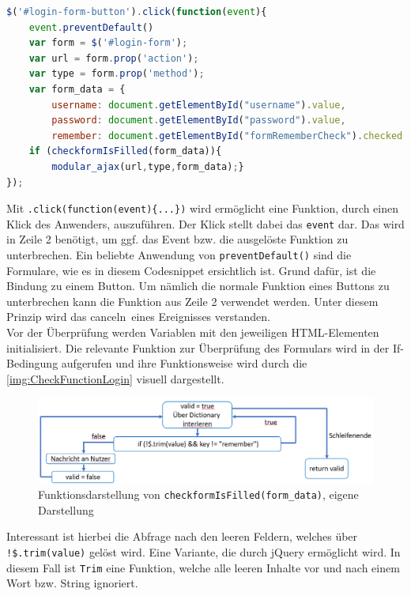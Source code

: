 \documentclass[a4paper,titlepage,halfparskip,12pt]{scrreprt}
\begin{document}
\begin{onehalfspacing}
\begin{lstlisting}[language=Javascript,caption=Angehängte Funktion an ein HTML-Element,label={lst:JSLoginButton}]
$('#login-form-button').click(function(event){
	event.preventDefault()
	var form = $('#login-form');
	var url = form.prop('action');
	var type = form.prop('method');
	var form_data = {
		username: document.getElementById("username").value,
		password: document.getElementById("password").value,
		remember: document.getElementById("formRememberCheck").checked }
	if (checkformIsFilled(form_data)){
		modular_ajax(url,type,form_data);}
});
\end{lstlisting}
Mit \texttt{.click(function(event)\{...\})} wird ermöglicht eine Funktion, durch einen Klick des Anwenders, auszuführen. Der Klick stellt dabei das \texttt{event} dar. Das wird in Zeile 2 benötigt, um ggf. das Event bzw. die ausgelöste Funktion zu unterbrechen. Ein beliebte Anwendung von \texttt{preventDefault()} sind die Formulare, wie es in diesem Codesnippet ersichtlich ist. Grund dafür, ist die Bindung zu einem Button. Um nämlich die normale Funktion eines Buttons zu unterbrechen kann die Funktion aus Zeile 2 verwendet werden. Unter diesem Prinzip wird das \glqq canceln\grqq\ eines Ereignisses verstanden. \cite{w3schoolsPrevDefault}\\
Vor der Überprüfung werden Variablen mit den jeweiligen \ac{HTML}-Elementen initialisiert. Die relevante Funktion zur Überprüfung des Formulars wird in der If-Bedingung aufgerufen und ihre Funktionsweise wird durch die \autoref{img:CheckFunctionLogin} visuell dargestellt.
\begin{figure}[h]
	\centering
	\includegraphics[scale=0.8]{images/FunktionUeberpruefenLogin}
	\caption{Funktionsdarstellung von \texttt{checkformIsFilled(form\_data)}, eigene Darstellung}
	\label{img:CheckFunctionLogin}
\end{figure}
Interessant ist hierbei die Abfrage nach den leeren Feldern, welches über \texttt{!\$.trim(value)} gelöst wird. Eine Variante, die durch jQuery ermöglicht wird. In diesem Fall ist \texttt{Trim} eine Funktion, welche alle leeren Inhalte vor und nach einem Wort bzw. String ignoriert. \cite{jQueryTrim}\\ 

\end{onehalfspacing}
\end{document}
